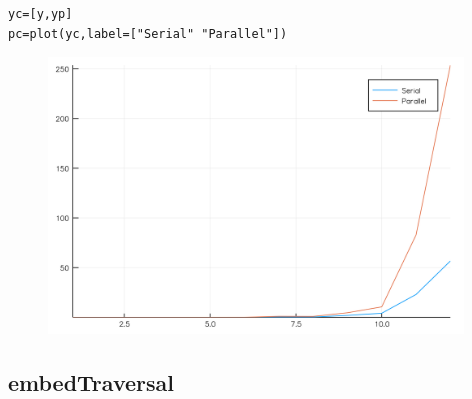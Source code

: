 \documentclass[a4paper,12pt]{article}
\begin{document}
\newpage
\begin{verbatim}
yc=[y,yp]
pc=plot(yc,label=["Serial" "Parallel"])
\end{verbatim}
\begin{figure}[ht!]
\centering
\includegraphics[width=11cm,scale=0.5]{compstruct.png}
\end{figure}
\newpage

\subsection{embedTraversal}
\end{document}
